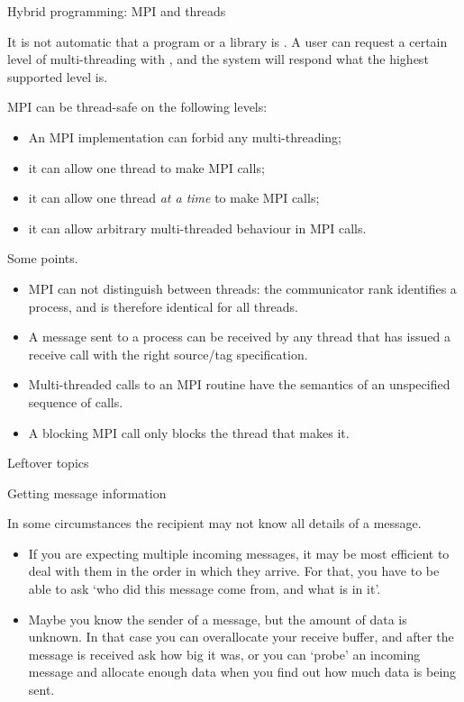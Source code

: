 
 {Hybrid programming: MPI and threads}\

It is not automatic that a program or a library is
.  A user can request a certain level of
multi-threading with , and the system
will respond what the highest supported level is.

MPI can be thread-safe on the following levels:
\begin{itemize}
\item An MPI implementation can forbid any multi-threading;
\item it can allow one thread to make MPI calls;
\item it can allow one thread \emph{at a time} to make MPI calls;
\item it can allow arbitrary multi-threaded behaviour in MPI calls.
\end{itemize}

Some points.
\begin{itemize}
\item MPI can not distinguish between threads: the communicator rank
  identifies a process, and is therefore identical for all threads.
\item A message sent to a process can be received by any thread that
  has issued a receive call with the right source/tag specification.
\item Multi-threaded calls to an MPI routine have the semantics of an
  unspecified sequence of calls.
\item A blocking MPI call only blocks the thread that makes it.
\end{itemize}

 {Leftover topics}

 {Getting message information}

In some circumstances the recipient may not know all details of a message.
\begin{itemize}
\item If you are expecting multiple incoming messages, it may be most
  efficient to deal with them in the order in which they arrive. For
  that, you have to be able to ask `who did this message come from,
  and what is in it'.
\item Maybe you know the sender of a message, but the amount of data
  is unknown. In that case you can overallocate your receive buffer,
  and after the message is received ask how big it was, or you can
  `probe' an incoming message and allocate enough data when you find
  out how much data is being sent.
\end{itemize}


